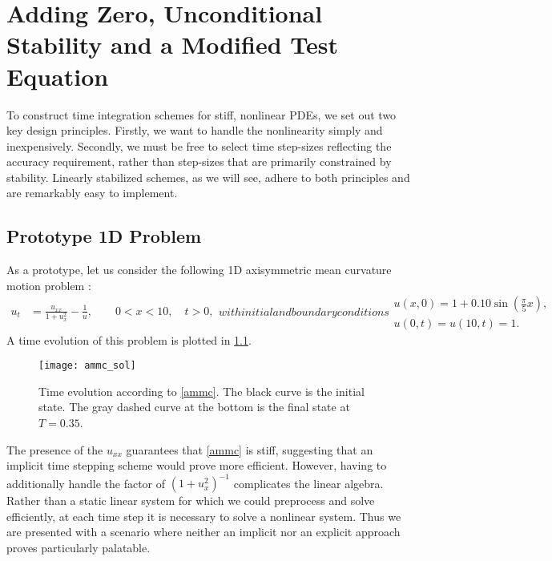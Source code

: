 \chapter{Adding Zero, Unconditional Stability and a Modified Test Equation}
To construct time integration schemes for stiff, nonlinear PDEs, we set out two key design principles. Firstly, we want to handle the nonlinearity simply and inexpensively. Secondly, we must be free to select time step-sizes reflecting the accuracy requirement, rather than step-sizes that are primarily constrained by stability. Linearly stabilized schemes, as we will see, adhere to both principles and are remarkably easy to implement.

\section{Prototype 1D Problem}
As a prototype, let us consider the following 1D axisymmetric mean curvature motion problem \cite{duchemin2014explicit}: 
\begin{subequations} 
\begin{align}
u_t &= \frac{u_{xx}}{1 + u_x^2} - \frac{1}{u}, 
\qquad 0 < x < 10, \quad t > 0,
\label{ammc 1}
\end{align}
with initial and boundary conditions
\begin{gather}
u(x,0) = 1 + 0.10\sin\left( \frac{\pi}{5}x \right),
\\
u(0,t)=u(10,t)=1.
\end{gather}
\label{ammc}
\end{subequations}
A time evolution of this problem is plotted in \cref{fig:ammc sol}.
\begin{figure}[htb!]
        \centering
\texttt{[image: ammc\_sol]}
\caption[Numerical solution to a 1D axisymmetric mean curvature motion problem]{Time evolution according to \cref{ammc}. The black curve is the initial state. The gray dashed curve at the bottom is the final state at $T=0.35$.}
\label{fig:ammc sol}
\end{figure}

The presence of the $u_{xx}$ guarantees that \eqref{ammc} is stiff, suggesting that an implicit time stepping scheme would prove more efficient. However, having to additionally handle the factor of $(1+u_x^2)^{-1}$ complicates the linear algebra. Rather than a static linear system for which we could preprocess and solve efficiently, at each time step it is necessary to solve a nonlinear system. Thus we are presented with a scenario where neither an implicit nor an explicit approach proves particularly palatable.

